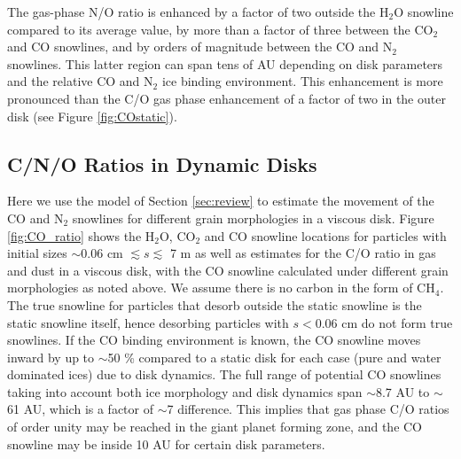 \documentclass[apj]{emulateapj}
\begin{document}
The gas-phase N/O ratio is enhanced by a factor of two outside the H$_2$O snowline compared to its average value, by more than a factor of three between the CO$_2$ and CO snowlines, and by orders of magnitude between the CO and N$_2$ snowlines. This latter region can span tens of AU depending on disk parameters and the relative CO and N$_2$ ice binding environment. This enhancement is more pronounced than the C/O gas phase enhancement of a factor of two in the outer disk (see Figure \ref{fig:COstatic}). %

\subsection{C/N/O Ratios in Dynamic Disks}
\label{sec:dynamic}



Here we use the model of Section \ref{sec:review} to estimate the movement of the CO and N$_2$ snowlines for different grain morphologies in a viscous disk. Figure \ref{fig:CO_ratio} shows the H$_2$O, CO$_2$ and CO snowline locations for particles with initial sizes $\sim0.06$ cm $\lesssim s \lesssim$ 7 m as well as estimates for the C/O ratio in gas and dust in a viscous disk, with the CO snowline calculated under different grain morphologies as noted above. We assume there is no carbon in the form of CH$_4$. The true snowline for particles that desorb outside the static snowline is the static snowline itself, hence desorbing particles with $s<0.06$ cm do not form true snowlines. If the CO binding environment is known, the CO snowline moves inward by up to $\sim$50 \% compared to a static disk for each case (pure and water dominated ices) due to disk dynamics. The full range of potential CO snowlines taking into account both ice morphology and disk dynamics span $\sim$8.7 AU to $\sim$61 AU, which is a factor of $\sim$7 difference. This implies that gas phase C/O ratios of order unity may be reached in the giant planet forming zone, and the CO snowline may be inside 10 AU for certain disk parameters.  
\end{document}
